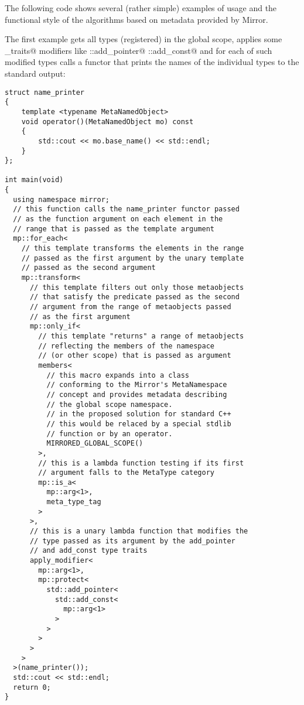 The following code shows several (rather simple) examples of usage
and the functional style of the algorithms based on metadata provided by Mirror.

The first example gets all types (registered) in the global scope,
applies some \verb@type_traits@ modifiers like \verb@std::add_pointer@
\verb@std::add_const@ and for each of such modified types calls a functor
that prints the names of the individual types to the standard output:

\begin{lstlisting}
struct name_printer
{
    template <typename MetaNamedObject>
    void operator()(MetaNamedObject mo) const
    {
        std::cout << mo.base_name() << std::endl;
    }
};

int main(void)
{
  using namespace mirror;
  // this function calls the name_printer functor passed
  // as the function argument on each element in the 
  // range that is passed as the template argument
  mp::for_each<
    // this template transforms the elements in the range
    // passed as the first argument by the unary template
    // passed as the second argument
    mp::transform<
      // this template filters out only those metaobjects
      // that satisfy the predicate passed as the second
      // argument from the range of metaobjects passed
      // as the first argument
      mp::only_if<
        // this template "returns" a range of metaobjects
        // reflecting the members of the namespace
        // (or other scope) that is passed as argument
        members<
          // this macro expands into a class
          // conforming to the Mirror's MetaNamespace
          // concept and provides metadata describing
          // the global scope namespace.
          // in the proposed solution for standard C++
          // this would be relaced by a special stdlib
          // function or by an operator.
          MIRRORED_GLOBAL_SCOPE()
        >,
        // this is a lambda function testing if its first
        // argument falls to the MetaType category
        mp::is_a<
          mp::arg<1>,
          meta_type_tag
        >
      >,
      // this is a unary lambda function that modifies the
      // type passed as its argument by the add_pointer
      // and add_const type traits
      apply_modifier<
        mp::arg<1>,
        mp::protect<
          std::add_pointer<
            std::add_const<
              mp::arg<1>
            >
          >
        >
      >
    >
  >(name_printer());
  std::cout << std::endl;
  return 0;
}

\end{lstlisting}


